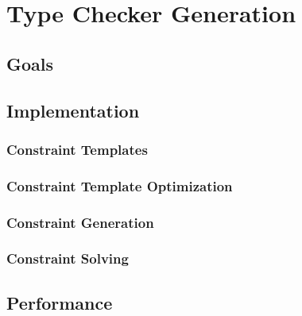 \chapter{Type Checker Generation}
\section{Goals}
\section{Implementation}
\subsection{Constraint Templates}
\subsection{Constraint Template Optimization}
\subsection{Constraint Generation}
\subsection{Constraint Solving}
\section{Performance}

